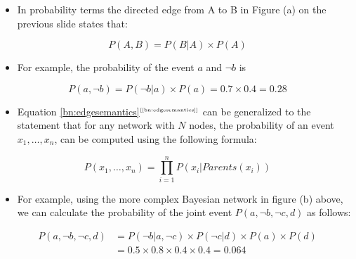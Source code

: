 \documentclass[xcolor={table}]{beamer}
\newcommand{\ourEqRef}[1]{\eqref{#1}$^{\text{\tiny[\pageref{#1}]}}$}
\begin{document}
 \begin{frame} 
 \begin{itemize}
 	\item In probability terms the directed edge from A to B in Figure (a) on the previous slide states that:
\end{itemize}
\begin{equation}
P(A,B)=P(B|A) \times P(A)
\label{bn:edgesemantics}
\end{equation}
\begin{itemize}
	\item For example, the probability of the event $a$ and $\lnot b$ is
\end{itemize}
\begin{equation*}
P(a,\lnot b)=P(\lnot b|a) \times P(a) = 0.7 \times 0.4 = 0.28
\end{equation*}
\end{frame} 

 \begin{frame} 
 \begin{itemize}
 	\item Equation \ourEqRef{bn:edgesemantics} can be generalized to the statement that for any network with $N$ nodes, the probability of an event $x_1, \dots, x_n$,  can be computed using the following formula:
\end{itemize}
\begin{equation}
P(x_1, \dots, x_n ) = \prod_{i=1}^n P(x_i|Parents(x_i))
\label{eq:bnparents}
\end{equation}
\end{frame} 



 \begin{frame} 
 \begin{itemize}
 	\item For example, using the more complex Bayesian network in figure (b) above, we can calculate the probability of the joint event $P(a, \lnot b, \lnot c, d)$ as follows:
\end{itemize}
\begin{align*}
P(a, \lnot b, \lnot c, d) &= P(\lnot b | a, \lnot c) \times P(\lnot c | d) \times P(a) \times P(d)\\
&= 0.5 \times 0.8 \times 0.4 \times 0.4 = 0.064
\end{align*}
\end{frame} 
\end{document}
